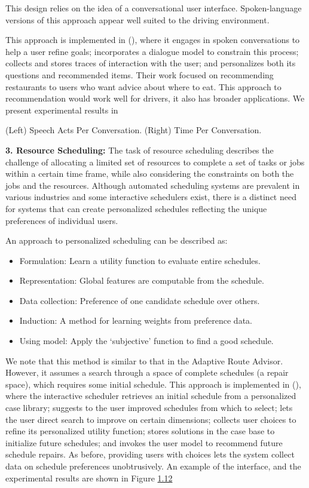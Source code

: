 \documentclass[
  letterpaper,
  DIV=11,
  numbers=noendperiod,
  oneside]{scrreprt}
\theoremstyle{remark}
\begin{document}
This design relies on the idea of a conversational user interface.
Spoken-language versions of this approach appear well suited to the
driving environment.

This approach is implemented in
(), where it
engages in spoken conversations to help a user refine goals;
incorporates a dialogue model to constrain this process; collects and
stores traces of interaction with the user; and personalizes both its
questions and recommended items. Their work focused on recommending
restaurants to users who want advice about where to eat. This approach
to recommendation would work well for drivers, it also has broader
applications. We present experimental results in

(Left) Speech Acts Per Conversation. (Right) Time Per Conversation.

\textbf{3. Resource Scheduling:} The task of resource scheduling
describes the challenge of allocating a limited set of resources to
complete a set of tasks or jobs within a certain time frame, while also
considering the constraints on both the jobs and the resources. Although
automated scheduling systems are prevalent in various industries and
some interactive schedulers exist, there is a distinct need for systems
that can create personalized schedules reflecting the unique preferences
of individual users.

An approach to personalized scheduling can be described as:

\begin{itemize}
\item
  Formulation: Learn a utility function to evaluate entire schedules.
\item
  Representation: Global features are computable from the schedule.
\item
  Data collection: Preference of one candidate schedule over others.
\item
  Induction: A method for learning weights from preference data.
\item
  Using model: Apply the `subjective' function to find a good schedule.
\end{itemize}

We note that this method is similar to that in the Adaptive Route
Advisor. However, it assumes a search through a space of complete
schedules (a repair space), which requires some initial schedule. This
approach is implemented in
(),
where the interactive scheduler retrieves an initial schedule from a
personalized case library; suggests to the user improved schedules from
which to select; lets the user direct search to improve on certain
dimensions; collects user choices to refine its personalized utility
function; stores solutions in the case base to initialize future
schedules; and invokes the user model to recommend future schedule
repairs. As before, providing users with choices lets the system collect
data on schedule preferences unobtrusively. An example of the interface,
and the experimental results are shown in Figure
\hyperref[fig:exp-3]{1.12}
\end{document}
